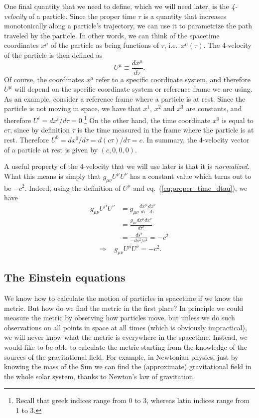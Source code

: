 \documentclass[11pt, a4paper,oneside,openright]{book}
\numberwithin{equation}{section}
\begin{document}
One final quantity that we need to define, which we will need later, is the {\it 4-velocity} of a particle. Since the proper time $\tau$ is a quantity that increases monotonically along a particle's trajectory, we can use it to parametrize the path traveled by the particle. In other words, we can think of the spacetime coordinates $x^{\mu}$ of the particle as being functions of $\tau$, i.e.\ $x^{\mu}(\tau)$. The 4-velocity of the particle is then defined as
\begin{equation}
U^{\mu}\equiv \frac{dx^{\mu}}{d\tau}.
\end{equation}
Of course, the coordinates $x^{\mu}$ refer to a specific coordinate system, and therefore $U^{\mu}$ will depend on the specific coordinate system or reference frame we are using. As an example, consider a reference frame where a particle is at rest. Since the particle is not moving in space, we have that $x^1$, $x^2$ and $x^3$ are constants, and therefore $U^i=dx^i/d\tau=0$.\footnote{Recall that greek indices range from 0 to 3, whereas latin indices range from 1 to 3.} On the other hand, the time coordinate $x^0$ is equal to $c\tau$, since by definition $\tau$ is the time measured in the frame where the particle is at rest. Therefore $U^0=dx^0/d\tau=d(c\tau)/d\tau=c$. In summary, the 4-velocity vector of a particle at rest is given by $(c,0,0,0)$.

A useful property of the 4-velocity that we will use later is that it is {\it normalized}. What this means is simply that $g_{\mu\nu}U^{\mu}U^{\nu}$ has a constant value which turns out to be $-c^2$. Indeed, using the definition of $U^{\mu}$ and eq.\ (\ref{eq:proper_time_dtau}), we have
\begin{equation}
\begin{split}
g_{\mu\nu}U^{\mu}U^{\nu}&=g_{\mu\nu}\frac{dx^{\mu}}{d\tau}\frac{dx^{\nu}}{d\tau}\\
&=\frac{g_{\mu\nu}dx^{\mu}dx^{\nu}}{d\tau^2}\\
&=\frac{ds^2}{-ds^2/c^2}=-c^2
\end{split}
\end{equation}
\begin{equation}
\Rightarrow~~~~g_{\mu\nu}U^{\mu}U^{\nu}=-c^2.
\end{equation}


\subsection{The Einstein equations}

We know how to calculate the motion of particles in spacetime if we know the metric. But how do we find the metric in the first place? In principle we could measure the metric by observing how particles move, but unless we do such observations on all points in space at all times (which is obviously impractical), we will never know what the metric is everywhere in the spacetime. Instead, we would like to be able to calculate the metric starting from the knowledge of the sources of the gravitational field. For example, in Newtonian physics, just by knowing the mass of the Sun we can find the (approximate) gravitational field in the whole solar system, thanks to Newton's law of gravitation.
\end{document}
